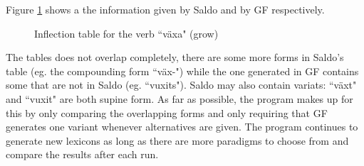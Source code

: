 \documentclass{report}
\begin{document}
Figure \ref{pic:TabVax} shows a the information given by Saldo and by GF respectively.\\
\begin{figure}[h]
  \begin{center}
\hspace{5mm}
\caption{Inflection table for the verb ``växa" (grow)}
\label{pic:TabVax}
  \end{center}
\end{figure}
The tables does not overlap completely, there are some more forms in Saldo's table (eg. the 
compounding form ``väx-")
while the one generated in GF contains some that are not in Saldo (eg. ``vuxits").
Saldo may also contain variats: ``växt" and ``vuxit" are both supine form.
As far as possible, the program makes up for this by only comparing the overlapping forms
and only requiring that GF generates one variant whenever alternatives are given. 
The program continues to generate new lexicons as long as there are more
paradigms to choose from and compare the results after each run.
\end{document}
